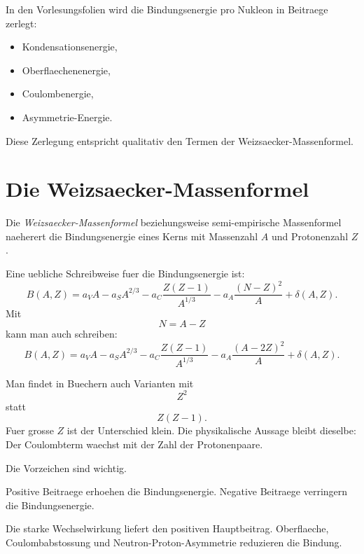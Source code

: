 \begin{notebox}
In den Vorlesungsfolien wird die Bindungsenergie pro Nukleon in Beitraege zerlegt:
\begin{itemize}
    \item Kondensationsenergie,
    \item Oberflaechenenergie,
    \item Coulombenergie,
    \item Asymmetrie-Energie.
\end{itemize}
Diese Zerlegung entspricht qualitativ den Termen der Weizsaecker-Massenformel.
\end{notebox}

\section{Die Weizsaecker-Massenformel}

\begin{definitionbox}
Die \emph{Weizsaecker-Massenformel} beziehungsweise semi-empirische Massenformel
naeherert die Bindungsenergie eines Kerns mit Massenzahl $A$ und Protonenzahl $Z$.
\end{definitionbox}

\begin{formulabox}
Eine uebliche Schreibweise fuer die Bindungsenergie ist:
\[
    B(A,Z)
    =
    a_V A
    - a_S A^{2/3}
    - a_C \frac{Z(Z-1)}{A^{1/3}}
    - a_A \frac{(N-Z)^2}{A}
    + \delta(A,Z).
\]
Mit
\[
    N=A-Z
\]
kann man auch schreiben:
\[
    B(A,Z)
    =
    a_V A
    - a_S A^{2/3}
    - a_C \frac{Z(Z-1)}{A^{1/3}}
    - a_A \frac{(A-2Z)^2}{A}
    + \delta(A,Z).
\]
\end{formulabox}

\begin{notebox}
Man findet in Buechern auch Varianten mit
\[
    Z^2
\]
statt
\[
    Z(Z-1).
\]
Fuer grosse $Z$ ist der Unterschied klein.
Die physikalische Aussage bleibt dieselbe:
Der Coulombterm waechst mit der Zahl der Protonenpaare.
\end{notebox}

\begin{conceptbox}
Die Vorzeichen sind wichtig.

Positive Beitraege erhoehen die Bindungsenergie.
Negative Beitraege verringern die Bindungsenergie.

Die starke Wechselwirkung liefert den positiven Hauptbeitrag.
Oberflaeche, Coulombabstossung und Neutron-Proton-Asymmetrie reduzieren die Bindung.
\end{conceptbox}


